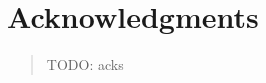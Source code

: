 
\begingroup
\let\raggedsection\centering

\chapter*{Acknowledgments}
\label{cha:acknowledgments}
\endgroup
\begin{quotation}
	\noindent TODO: acks
\end{quotation}
